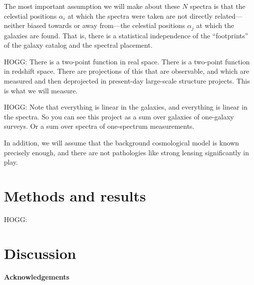 \documentclass{article}
\begin{document}
The most important assumption we will make about these $N$ spectra is that the celestial positions $\alpha_i$ at which the spectra were taken are not directly related---neither biased towards or away from---the celestial positions $\alpha_j$ at which the galaxies are found.
That is, there is a statistical independence of the ``footprints'' of the galaxy catalog and the spectral placement.

HOGG: There is a two-point function in real space. There is a two-point function in redshift space. There are projections of this that are observable, and which are measured and then deprojected in present-day large-scale structure projects. This is what we will measure.

HOGG: Note that everything is linear in the galaxies, and everything is linear in the spectra. So you can see this project as a sum over galaxies of one-galaxy surveys. Or a sum over spectra of one-spectrum measurements.

In addition, we will assume that the background cosmological model is known precisely enough, and there are not pathologies like strong lensing significantly in play.

\section{Methods and results}
HOGG: 

\section{Discussion}

\paragraph{Acknowledgements}
\end{document}
